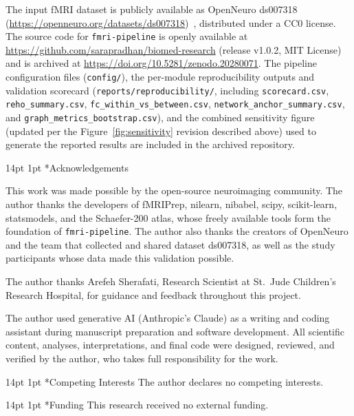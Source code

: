 \documentclass[12pt]{article}
\makeatletter
\renewcommand\section{%
  \@startsection{section}{1}{\z@}%
    {14pt \@plus 4pt \@minus 2pt}%
    {1pt}%
    {\normalfont\large\bfseries\color{black}}}
\makeatother
\begin{document}
The input fMRI dataset is publicly available as OpenNeuro ds007318
(\url{https://openneuro.org/datasets/ds007318})~\citep{wang2026ds007318},
distributed under a CC0 license. The source code for
\texttt{fmri-pipeline} is openly available at
\url{https://github.com/sarapradhan/biomed-research} (release v1.0.2,
MIT License) and is archived at
\url{https://doi.org/10.5281/zenodo.20280071}. The pipeline
configuration files (\texttt{config/}), the per-module reproducibility
outputs and validation scorecard (\texttt{reports/reproducibility/},
including \texttt{scorecard.csv}, \texttt{reho\_summary.csv},
\texttt{fc\_within\_vs\_between.csv},
\texttt{network\_anchor\_summary.csv}, and
\texttt{graph\_metrics\_bootstrap.csv}), and the combined sensitivity
figure (updated per the Figure~\ref{fig:sensitivity} revision described
above) used to generate the reported results are included in the
archived repository.

\section*{Acknowledgements}

This work was made possible by the open-source neuroimaging community.
The author thanks the developers of fMRIPrep, nilearn, nibabel, scipy,
scikit-learn, statsmodels, and the Schaefer-200 atlas, whose freely
available tools form the foundation of \texttt{fmri-pipeline}. The
author also thanks the creators of OpenNeuro and the team that collected
and shared dataset ds007318, as well as the study participants whose
data made this validation possible.

The author thanks Arefeh Sherafati, Research Scientist at St.\ Jude
Children's Research Hospital, for guidance and feedback throughout this
project.

The author used generative AI (Anthropic's Claude) as a writing and
coding assistant during manuscript preparation and software development.
All scientific content, analyses, interpretations, and final code were
designed, reviewed, and verified by the author, who takes full
responsibility for the work.

\section*{Competing Interests}
The author declares no competing interests.

\section*{Funding}
This research received no external funding.




\end{document}
